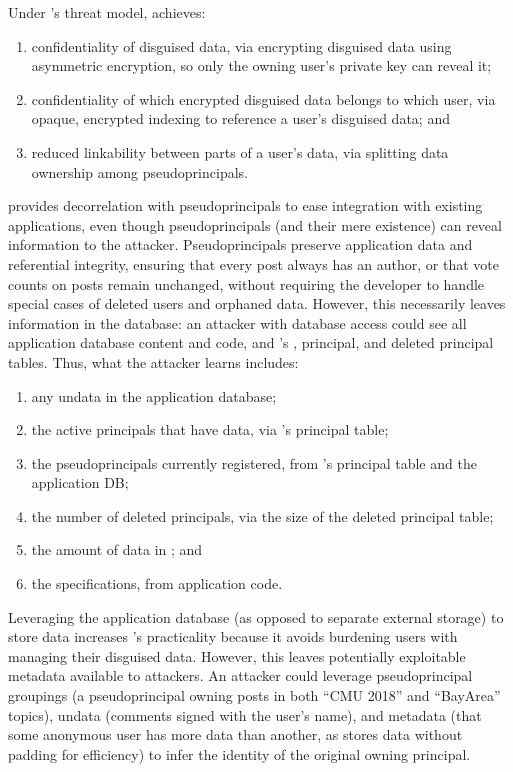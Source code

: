 %
Under \sys's threat model, \sys achieves:
\begin{enumerate}[nosep]
    \item confidentiality of disguised data, via encrypting disguised data using asymmetric encryption, so only the owning user’s private key can reveal it;
    \item confidentiality of which encrypted disguised data belongs to which
        user, via opaque, encrypted indexing to reference a user’s disguised data; and
    \item reduced linkability between parts of a user's data, via splitting data ownership among pseudoprincipals.
\end{enumerate}
%
\sys provides decorrelation with pseudoprincipals to ease integration with
existing applications, even though pseudoprincipals (and their mere existence)
can reveal information to the attacker.
%
Pseudoprincipals preserve application data and referential integrity, ensuring
that \eg every post always has an author, or that vote counts on posts remain
unchanged, without requiring the developer to handle special cases of deleted
users and orphaned data.
%
However, this necessarily leaves information in the database: an attacker with
database access could see all application database content and code, and \sys's
\xx, principal, and deleted principal tables.
%
Thus, what the attacker learns includes:
\begin{enumerate}[nosep]
  \item any un\xxed data in the application database;
  \item the active principals that have \xxed data, via \sys's principal
      table;
  \item the pseudoprincipals currently registered, from \sys's
    principal table and the application DB;
  \item the number of deleted principals, via the size of the deleted
    principal table;
  \item the amount of \xxed data in \sys; and
  \item the \xx specifications, from application code.
\end{enumerate}

%

Leveraging the application database (as opposed to separate external storage) to
store \xxed data increases \sys's practicality because it avoids burdening users
with managing their disguised data.  However, this leaves potentially
exploitable metadata available to attackers.
%
An attacker could leverage pseudoprincipal groupings (\eg a pseudoprincipal
owning posts in both ``CMU 2018'' and ``BayArea'' topics), un\xxed data
(\eg comments signed with the user's name), and \sys metadata (\eg that some
anonymous user has more \xxed data than another, as \sys stores \xxed data without
padding for efficiency) to infer the identity of the original owning principal.

